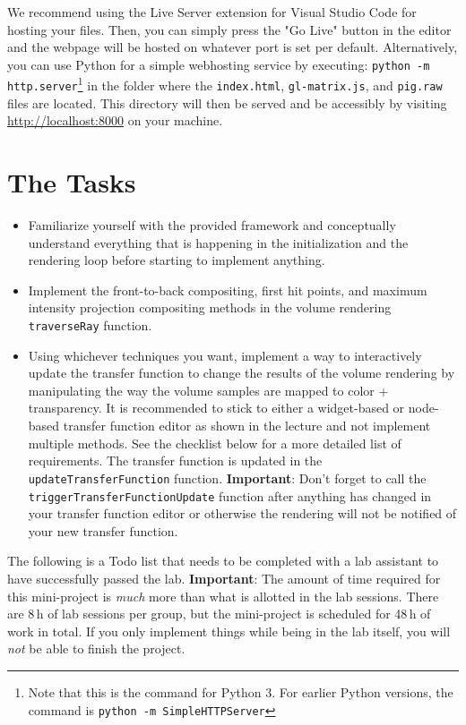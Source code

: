\documentclass{labinstructions}
\begin{document}
We recommend using the Live Server extension for Visual Studio Code for hosting your files. Then, you can simply press the "Go Live" button in the editor and the webpage will be hosted on whatever port is set per default.  
Alternatively, you can use Python for a simple webhosting service by executing: \texttt{python -m http.server}\footnote{Note that this is the command for Python 3. For earlier Python versions, the command is \texttt{python -m SimpleHTTPServer}} in the folder where the \texttt{index.html}, \texttt{gl-matrix.js}, and \texttt{pig.raw} files are located.  This directory will then be served and be accessibly by visiting \href{http://localhost:8000}{http://localhost:8000} on your machine. 


\section{The Tasks}
\begin{itemize}
  \item Familiarize yourself with the provided framework and conceptually understand everything that is happening in the initialization and the rendering loop before starting to implement anything.
  \item Implement the front-to-back compositing, first hit points, and maximum intensity projection compositing methods in the volume rendering \texttt{traverseRay} function.
  \item Using whichever techniques you want, implement a way to interactively update the transfer function to change the results of the volume rendering by manipulating the way the volume samples are mapped to color + transparency.  It is recommended to stick to either a widget-based or node-based transfer function editor as shown in the lecture and not implement multiple methods.  See the checklist below for a more detailed list of requirements.  The transfer function is updated in the \texttt{updateTransferFunction} function.  \textbf{Important}:  Don't forget to call the \texttt{triggerTransferFunctionUpdate} function after anything has changed in your transfer function editor or otherwise the rendering will not be notified of your new transfer function.
\end{itemize}

The following is a Todo list that needs to be completed with a lab assistant to have successfully passed the lab.  \textbf{Important}:  The amount of time required for this mini-project is \emph{much} more than what is allotted in the lab sessions.  There are 8\,h of lab sessions per group, but the mini-project is scheduled for 48\,h of work in total.  If you only implement things while being in the lab itself, you will \emph{not} be able to finish the project.
\end{document}
